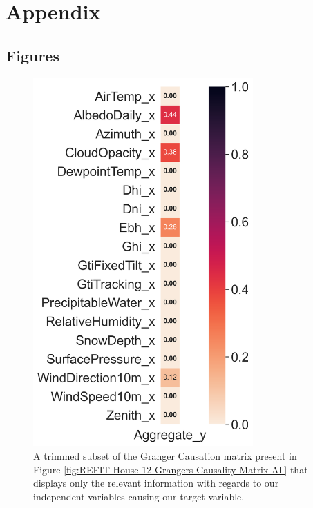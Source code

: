 \appendix
\chapter{Appendix}
\label{ch:Appendix}

\section{Figures}
\label{sec:Appendix:Figures}

\begin{figure}[H]
    \centering
    \includegraphics[width=0.75\textwidth]{Images/Chapter 5/REFIT/REFIT-House-12-Grangers-Causality-Matrix-Single.png}
    \caption{A trimmed subset of the Granger Causation matrix present in Figure \ref{fig:REFIT-House-12-Grangers-Causality-Matrix-All} that displays only the relevant information with regards to our independent variables causing our target variable.}
    \label{fig:REFIT-House-12-Grangers-Causality-Matrix-Single}
\end{figure}

